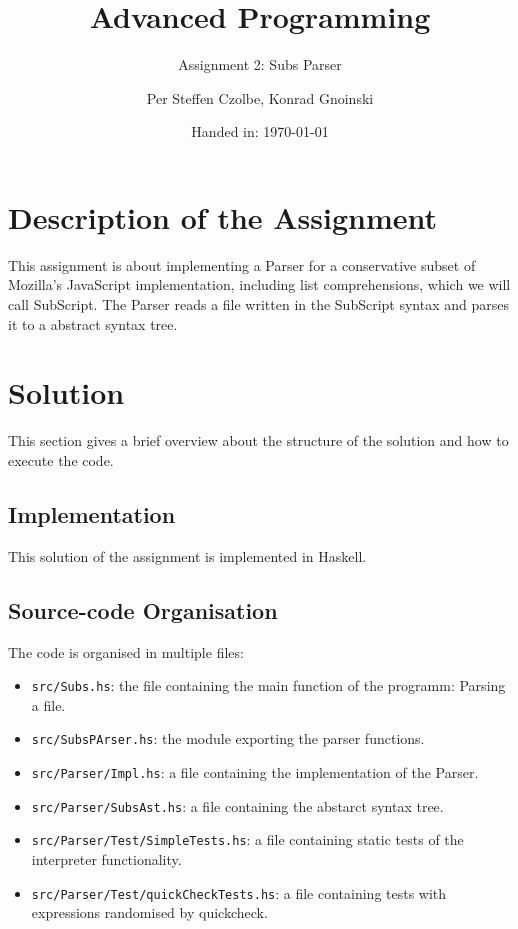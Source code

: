 \documentclass[11pt, a4paper]{article}
\author{Per Steffen Czolbe, Konrad Gnoinski}
\title{Advanced Programming}
\subtitle{Assignment 2: Subs Parser} %
\date{Handed in: \today}
\begin{document}
\maketitle

\tableofcontents

\section{Description of the Assignment}
This assignment is about implementing a Parser for a conservative subset of Mozilla’s JavaScript implementation, including list comprehensions, which we will call SubScript. The Parser reads a file written in the SubScript syntax and parses it to a abstract syntax tree.

\section{Solution}
This section gives a brief overview about the structure of the solution and how to execute the code.

\subsection{Implementation}
This solution of the assignment is implemented in Haskell.

\subsection{Source-code Organisation}
The code is organised in multiple files:
\begin{itemize}
	\item \texttt{src/Subs.hs}: the file containing the main function of the programm: Parsing a file.
	\item \texttt{src/SubsPArser.hs}: the module exporting the parser functions.
	\item \texttt{src/Parser/Impl.hs}: a file containing the implementation of the Parser.
	\item \texttt{src/Parser/SubsAst.hs}: a file containing the abstarct syntax tree.
	\item \texttt{src/Parser/Test/SimpleTests.hs}: a file containing static tests of the interpreter functionality.
	\item \texttt{src/Parser/Test/quickCheckTests.hs}: a file containing tests with expressions randomised by quickcheck.
\end{itemize}
\end{document}
